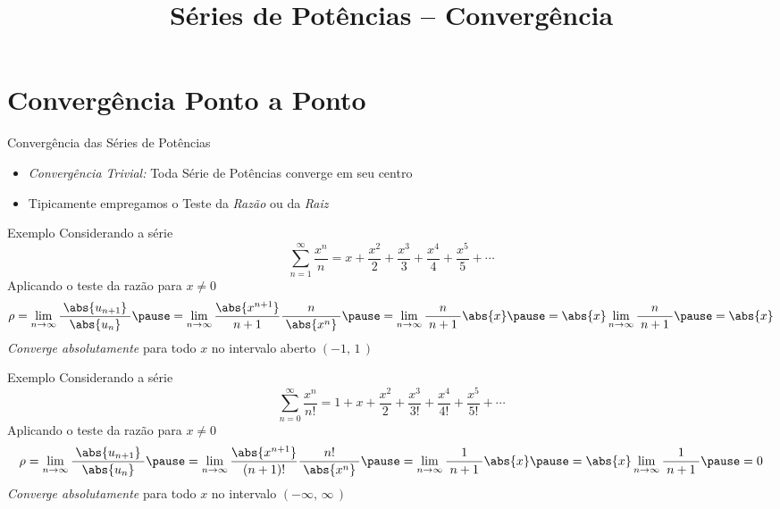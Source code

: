 
\usepackage{integracao_e_series}

\title{Séries de Potências -- Convergência}



\addtitle

\section{Convergência Ponto a Ponto}

\begin{frame}{Convergência das Séries de Potências}
  \begin{itemize}[<+->]
    \item \emph{Convergência Trivial:} Toda Série de Potências converge em seu centro\\[5mm]
    \item Tipicamente empregamos o Teste da \emph{Razão} ou da \emph{Raiz}
  \end{itemize}
\end{frame}

\addtocounter{exemplo}{1}
\begin{frame}{Exemplo \theexemplo}
  Considerando a série
  \[
    \sum_{n=1}^{\infty} \frac{x^n}{n}
    = x + \frac{x^2}{2}
        + \frac{x^3}{3}
        + \frac{x^4}{4}
        + \frac{x^5}{5}
        + \cdots
  \]
  \pause
  Aplicando o teste da razão para $x\neq 0$
  \[
    \rho   = \lim_{n\to\infty} \frac{\;\abs{u_{n+1}}\;}{\abs{u_n}}
    \pause = \lim_{n\to\infty} \frac{\abs{x^{n+1}}}{\;n+1\;} \frac{n}{\;\abs{x^n}\;}
    \pause = \lim_{n\to\infty} \frac{n}{\;n+1\;} \abs{x}
    \pause = \abs{x} \lim_{n\to\infty} \frac{n}{\;n+1\;}
    \pause = \abs{x}
  \]
  \pause
  \emph{Converge absolutamente} para todo $x$ no intervalo aberto $(-1,\,1\,)$
\end{frame}

\addtocounter{exemplo}{1}
\begin{frame}{Exemplo \theexemplo}
  Considerando a série
  \[
    \sum_{n=0}^{\infty} \frac{x^n}{n!}
    = 1 + x
        + \frac{x^2}{2}
        + \frac{x^3}{3!}
        + \frac{x^4}{4!}
        + \frac{x^5}{5!}
        + \cdots
  \]
  \pause
  Aplicando o teste da razão para $x\neq 0$
  \[
    \rho   = \lim_{n\to\infty} \frac{\;\abs{u_{n+1}}\;}{\abs{u_n}}
    \pause = \lim_{n\to\infty} \frac{\abs{x^{n+1}}}{\;(n+1)!\;} \frac{n!}{\;\abs{x^n}\;}
    \pause = \lim_{n\to\infty} \frac{1}{\;n+1\;} \abs{x}
    \pause = \abs{x} \lim_{n\to\infty} \frac{1}{\;n+1\;}
    \pause = 0
  \]
  \pause
  \emph{Converge absolutamente} para todo $x$ no intervalo $(-\infty,\,\infty\,)$
\end{frame}

